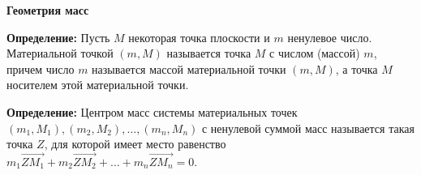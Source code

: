 \documentclass{article}
\begin{document}
    \large

    \begin{center}
        \textbf{Геометрия масс}
    \end{center}


    \textbf{Определение:} Пусть $M$ некоторая точка плоскости и $m$ ненулевое число.
    Материальной точкой $(m,M)$ называется точка $M$ с числом (массой) $m$, причем число $m$ называется массой материальной точки $(m, M)$, а точка $M$ носителем этой материальной точки.

    \textbf{Определение:} Центром масс системы материальных точек $(m_1, M_1), (m_2, M_2), \dotsc, (m_n,M_n)$ с ненулевой суммой масс называется такая точка $Z$, для которой имеет место
    равенство $m_1\overrightarrow{ZM_1}+m_2\overrightarrow{ZM_2}+ \dotsc + m_n\overrightarrow{ZM_n} = 0.$
\end{document}
